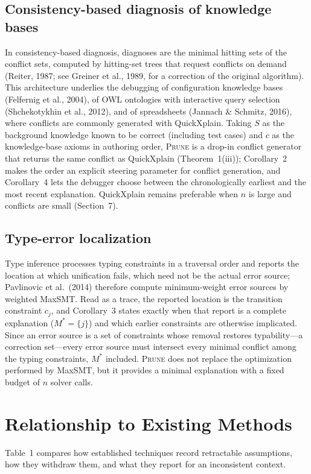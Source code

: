 \documentclass[11pt,reqno]{amsart}
\theoremstyle{plain}
\theoremstyle{definition}
\newcommand{\Mstar}{M^{*}}
\newcommand{\PRUNE}{\textsc{Prune}}
\begin{document}
\subsection{Consistency-based diagnosis of knowledge bases}
In consistency-based diagnosis, diagnoses are the minimal hitting sets of the
conflict sets, computed by hitting-set trees that request conflicts on demand
(Reiter, 1987; see Greiner et al., 1989, for a correction of the original
algorithm). This architecture underlies the debugging of configuration knowledge
bases (Felfernig et al., 2004), of OWL ontologies with interactive query selection
(Shchekotykhin et al., 2012), and of spreadsheets (Jannach \& Schmitz, 2016), where
conflicts are commonly generated with QuickXplain. Taking $S$ as the background
knowledge known to be correct (including test cases) and $c$ as the knowledge-base
axioms in authoring order, \PRUNE{} is a drop-in conflict generator that returns
the same conflict as QuickXplain (Theorem~1(iii)); Corollary~2 makes the order an
explicit steering parameter for conflict generation, and Corollary~4 lets the
debugger choose between the chronologically earliest and the most recent
explanation. QuickXplain remains preferable when $n$ is large and conflicts are
small (Section~7).

\subsection{Type-error localization}
Type inference processes typing constraints in a traversal order and reports the
location at which unification fails, which need not be the actual error source;
Pavlinovic et al.\ (2014) therefore compute minimum-weight error sources by
weighted MaxSMT. Read as a trace, the reported location is the transition
constraint $c_j$, and Corollary~3 states exactly when that report is a complete
explanation ($\Mstar=\{j\}$) and which earlier constraints are otherwise
implicated. Since an error source is a set of constraints whose removal restores
typability---a correction set---every error source must intersect every minimal
conflict among the typing constraints, $\Mstar$ included. \PRUNE{} does not replace
the optimization performed by MaxSMT, but it provides a minimal explanation with a
fixed budget of $n$ solver calls.

\section{Relationship to Existing Methods}
Table~1 compares how established techniques record retractable assumptions, how
they withdraw them, and what they report for an inconsistent context.
\end{document}
